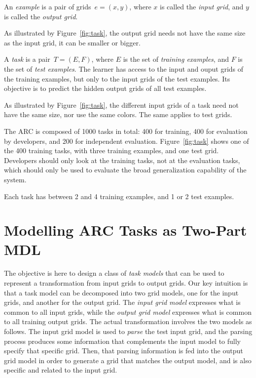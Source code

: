\documentclass[a4paper]{llncs}
\begin{document}
\begin{definition}[example] 
  An {\em example} is a pair of grids~$e = (x,y)$, where $x$ is called
  the {\em input grid}, and $y$ is called the {\em output grid}.
\end{definition}

As illustrated by Figure~\ref{fig:task}, the output grid needs not
have the same size as the input grid, it can be smaller or bigger.

\begin{definition}[task]
  A {\em task} is a pair~$T = (E,F)$, where $E$ is the set of {\em
    training examples}, and $F$ is the set of {\em test examples}.
  The learner has access to the input and ouput grids of the training
  examples, but only to the input grids of the test examples. Its
  objective is to predict the hidden output grids of all test
  examples.
\end{definition}

As illustrated by Figure~\ref{fig:task}, the different input grids of
a task need not have the same size, nor use the same colors. The same
applies to test grids.

The ARC is composed of 1000 tasks in total: 400 for training, 400 for
evaluation by developers, and 200 for independent
evaluation. Figure~\ref{fig:task} shows one of the 400 training tasks,
with three training examples, and one test grid. Developers should
only look at the training tasks, not at the evaluation tasks, which
should only be used to evaluate the broad generalization capability of
the system.

Each task has between 2 and 4 training examples, and 1 or 2 test
examples.

\section{Modelling ARC Tasks as Two-Part MDL}
\label{modelling}

The objective is here to design a class of {\em task models} that can
be used to represent a transformation from input grids to output
grids.
%
Our key intuition is that a task model can be decomposed into two grid
models, one for the input grids, and another for the output grid. The
{\em input grid model} expresses what is common to all input grids,
while the {\em output grid model} expresses what is common to all
training output grids.
%
The actual transformation involves the two models as follows. The
input grid model is used to {\em parse} the test input grid, and the
parsing process produces some information that complements the input
model to fully specify that specific grid. Then, that parsing
information is fed into the output grid model in order to generate a
grid that matches the output model, and is also specific and related
to the input grid.
\end{document}
